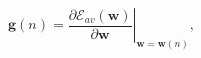 \begin{equation}
\label{eq:gradientvector}
\mathbf{g}(\mathit{n}) = 
\left. \frac{\partial \mathscr{E}_{av}(\mathbf{w})}{\partial
\mathbf{w}}\right|_{\mathbf{w}=\mathbf{w}(\mathit{n})} ,
\end{equation}
